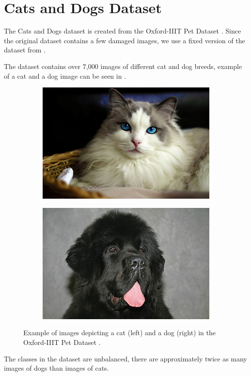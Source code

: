 \section{Cats and Dogs Dataset}\label{sec:cat_dog_dataset}
The Cats and Dogs dataset is created from the Oxford-IIIT Pet Dataset \cite{parkhi12a}. Since the original dataset contains a few damaged images, we use a fixed version of the dataset from \cite{ml4py_dataset}.

The dataset contains over $7$,$000$ images of different cat and dog breeds, example of a cat and a dog image can be seen in .
\begin{figure}[!ht]
    \centering
    \begin{subfigure}[t]{0.45\textwidth}
        \includegraphics[width=\textwidth]{Figures/datasets/cat.jpg}
        \label{fig:original:example_cat}
    \end{subfigure}\hfill
    \begin{subfigure}[t]{0.45\textwidth}
        \includegraphics[width=\textwidth]{Figures/datasets/dog.jpg}
        \label{fig:original:example_dog}
    \end{subfigure}
    \caption[Example of images depicting a cat (left) and a dog (right) in the Oxford-IIIT Pet Dataset]{Example of images depicting a cat (left) and a dog (right) in the Oxford-IIIT Pet Dataset \cite{parkhi12a}.}
    \label{fig:iiit_pet}
\end{figure}
The classes in the dataset are unbalanced, there are approximately twice as many images of dogs than images of cats.

